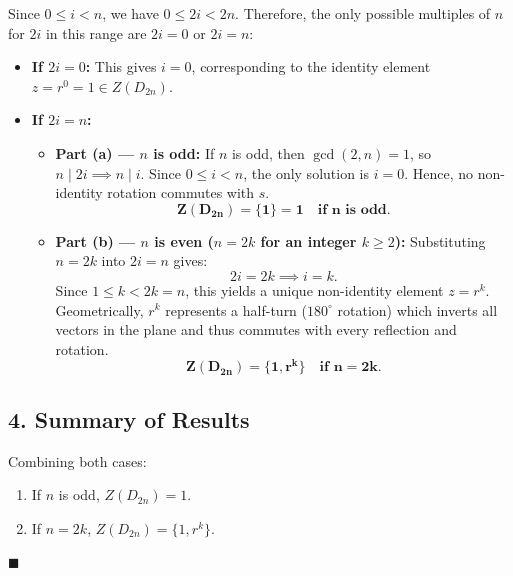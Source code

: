 \documentclass[11pt,a4paper]{article}
\begin{document}
Since $0 \le i < n$, we have $0 \le 2i < 2n$. Therefore, the only possible multiples of $n$ for $2i$ in this range are $2i = 0$ or $2i = n$:

\begin{itemize}
    \item \textbf{If $2i = 0$:}  
    This gives $i = 0$, corresponding to the identity element $z = r^0 = 1 \in Z(D_{2n})$.

    \item \textbf{If $2i = n$:}
    \begin{itemize}
        \item \textbf{Part (a) --- $n$ is odd:}  
        If $n$ is odd, then $\gcd(2, n) = 1$, so $n \mid 2i \implies n \mid i$. Since $0 \le i < n$, the only solution is $i = 0$. Hence, no non-identity rotation commutes with $s$.
        \[
        \mathbf{Z(D_{2n}) = \{1\} = 1 \quad \text{if } n \text{ is odd.}}
        \]

        \item \textbf{Part (b) --- $n$ is even ($n = 2k$ for an integer $k \ge 2$):}  
        Substituting $n = 2k$ into $2i = n$ gives:
        \[
        2i = 2k \implies i = k.
        \]
        Since $1 \le k < 2k = n$, this yields a unique non-identity element $z = r^k$.
        Geometrically, $r^k$ represents a half-turn ($180^\circ$ rotation) which inverts all vectors in the plane and thus commutes with every reflection and rotation.
        \[
        \mathbf{Z(D_{2n}) = \{1, r^k\} \quad \text{if } n = 2k.}
        \]
    \end{itemize}
\end{itemize}

\subsection*{4. Summary of Results}
Combining both cases:
\begin{enumerate}
    \item[\textbf{(a)}] If $n$ is odd, $Z(D_{2n}) = 1$.
    \item[\textbf{(b)}] If $n = 2k$, $Z(D_{2n}) = \{1, r^k\}$.
\end{enumerate}

\begin{flushright}
$\blacksquare$
\end{flushright}
\end{document}
